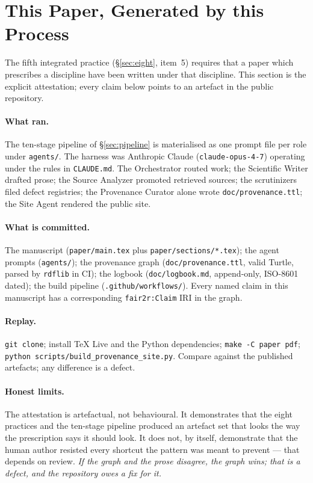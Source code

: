 \section{This Paper, Generated by this Process}
\label{sec:self}

The fifth integrated practice (\S\ref{sec:eight}, item~5) requires
that a paper which prescribes a discipline have been written under
that discipline. This section is the explicit attestation; every
claim below points to an artefact in the public repository.

\paragraph{What ran.}
The ten-stage pipeline of \S\ref{sec:pipeline} is materialised as
one prompt file per role under \texttt{agents/}. The harness was
Anthropic Claude (\texttt{claude-opus-4-7}) operating under the
rules in \texttt{CLAUDE.md}. The Orchestrator routed work; the
Scientific Writer drafted prose; the Source Analyzer promoted
retrieved sources; the scrutinizers filed defect registries; the
Provenance Curator alone wrote \texttt{doc/provenance.ttl}; the Site
Agent rendered the public site.

\paragraph{What is committed.}
The manuscript (\texttt{paper/main.tex} plus
\texttt{paper/sections/*.tex}); the agent prompts
(\texttt{agents/}); the provenance graph
(\texttt{doc/provenance.ttl}, valid Turtle, parsed by \texttt{rdflib}
in CI); the logbook (\texttt{doc/logbook.md}, append-only, ISO-8601
dated); the build pipeline (\texttt{.github/workflows/}). Every named
claim in this manuscript has a corresponding \texttt{fair2r:Claim}
IRI in the graph.

\paragraph{Replay.}
\texttt{git clone}; install TeX Live and the Python dependencies;
\texttt{make -C paper pdf};
\texttt{python scripts/build\_provenance\_site.py}. Compare against
the published artefacts; any difference is a defect.

\paragraph{Honest limits.}
The attestation is artefactual, not behavioural. It demonstrates
that the eight practices and the ten-stage pipeline produced an
artefact set that looks the way the prescription says it should
look. It does not, by itself, demonstrate that the human author
resisted every shortcut the pattern was meant to prevent --- that
depends on review. \emph{If the graph and the prose disagree, the
graph wins; that is a defect, and the repository owes a fix for
it.}
